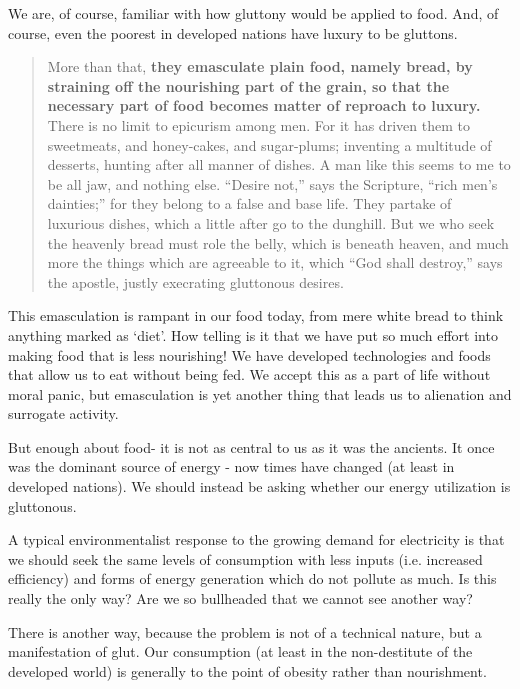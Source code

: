 \documentclass[letterpaper]{article}
\begin{document}
We are, of course, familiar with how gluttony would be applied to food. And, of course, even the poorest in developed nations have luxury to be gluttons.

\begin{quote}
  More than that, \textbf{they emasculate plain food, namely bread, by straining off the nourishing part of the grain, so that the necessary part of food becomes matter of reproach to luxury.} There is no limit to epicurism among men. For it has driven them to sweetmeats, and honey-cakes, and sugar-plums; inventing a multitude of desserts, hunting after all manner of dishes. A man like this seems to me to be all jaw, and nothing else. “Desire not,” says the Scripture, “rich men’s dainties;” for they belong to a false and base life. They partake of luxurious dishes, which a little after go to the dunghill. But we who seek the heavenly bread must role the belly, which is beneath heaven, and much more the things which are agreeable to it, which “God shall destroy,” says the apostle, justly execrating gluttonous desires.
\end{quote}

This emasculation is rampant in our food today, from mere white bread to think anything marked as `diet'. How telling is it that we have put so much effort into making food that is less nourishing! We have developed technologies and foods that allow us to eat without being fed. We accept this as a part of life without moral panic, but emasculation is yet another thing that leads us to alienation and surrogate activity.

But enough about food- it is not as central to us as it was the ancients. It once was the dominant source of energy - now times have changed (at least in developed nations). We should instead be asking whether our energy utilization is gluttonous.

A typical environmentalist response to the growing demand for electricity is that we should seek the same levels of consumption with less inputs (i.e. increased efficiency) and forms of energy generation which do not pollute as much. Is this really the only way? Are we so bullheaded that we cannot see another way?

There is another way, because the problem is not of a technical nature, but a manifestation of glut. Our consumption (at least in the non-destitute of the developed world) is generally to the point of obesity rather than nourishment.
\end{document}
